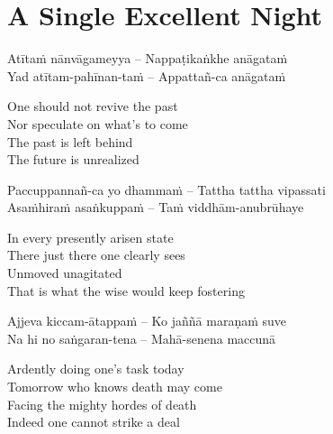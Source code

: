 
\section{A Single Excellent Night}
\label{single-excellent-night}

\begin{leader}
\end{leader}

\begin{twochants}
  Atītaṁ nānvāgameyya – Nappaṭikaṅkhe anāgataṁ\\
  Yad atītam-pahīnan-taṁ – Appattañ-ca anāgataṁ\\
\end{twochants}

\begin{english}
  One should not revive the past\\
  Nor speculate on what’s to come\\
  The past is left behind\\
  The future is unrealized
\end{english}

\begin{twochants}
  Paccuppannañ-ca yo dhammaṁ – Tattha tattha vipassati\\
  Asaṁhiraṁ asaṅkuppaṁ – Taṁ viddhām-anubrūhaye\\
\end{twochants}

\begin{english}
  In every presently arisen state\\
  There just there one clearly sees\\
  Unmoved unagitated\\
  That is what the wise would keep fostering
\end{english}

\begin{twochants}
  Ajjeva kiccam-ātappaṁ – Ko jaññā maraṇaṁ suve\\
  Na hi no saṅgaran-tena – Mahā-senena maccunā\\
\end{twochants}

\begin{english}
  Ardently doing one’s task today\\
  Tomorrow who knows death may come\\
  Facing the mighty hordes of death\\
  Indeed one cannot strike a deal
\end{english}

